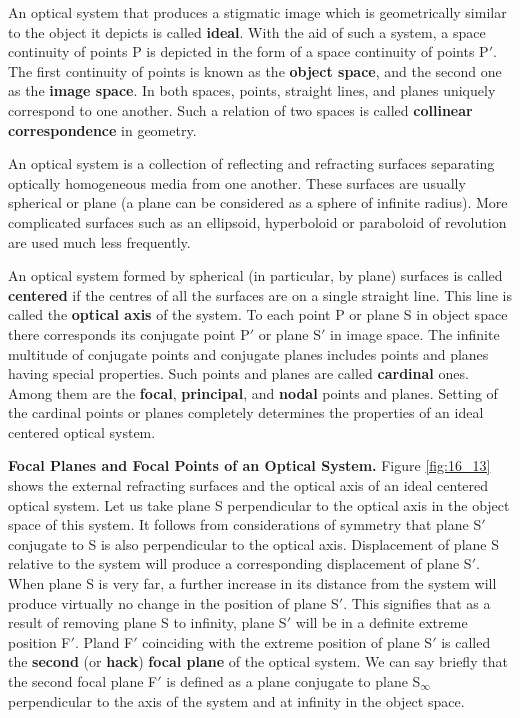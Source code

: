 An optical system that produces a stigmatic image which is geometrically similar to the object it depicts is called \textbf{ideal}.
With the aid of such a system, a space continuity of points P is depicted in the form of a space continuity of points P$'$.
The first continuity of points is known as the \textbf{object space}, and the second one as the \textbf{image space}.
In both spaces, points, straight lines, and planes uniquely correspond to one another.
Such a relation of two spaces is called \textbf{collinear correspondence} in geometry.

An optical system is a collection of reflecting and refracting surfaces separating optically homogeneous media from one another.
These surfaces are usually spherical or plane (a plane can be considered as a sphere of infinite radius).
More complicated surfaces such as an ellipsoid, hyperboloid or paraboloid of revolution are used much
less frequently.

An optical system formed by spherical (in particular, by plane) surfaces is called \textbf{centered} if the centres of all the surfaces are on a single straight line.
This line is called the \textbf{optical axis} of the system.
To each point P or plane S in object space there corresponds its conjugate point P$'$ or plane S$'$ in image space.
The infinite multitude of conjugate points and conjugate planes includes points and planes having special properties.
Such points and planes are called \textbf{cardinal} ones.
Among them are the \textbf{focal}, \textbf{principal}, and \textbf{nodal} points and
planes.
Setting of the cardinal points or planes completely determines the properties of an ideal centered optical system.

\textbf{Focal Planes and Focal Points of an Optical System.}
Figure \ref{fig:16_13} shows the external refracting surfaces and the optical axis of an ideal centered optical system.
Let us take plane S perpendicular to the optical axis in the object space of this system.
It follows from considerations of symmetry that plane S$'$ conjugate to S is also perpendicular to the optical axis.
Displacement of plane S relative to the system will produce a corresponding displacement of plane S$'$.
When plane S is very far, a further increase in its distance from the system will produce virtually no change in the position of plane S$'$.
This signifies that as a result of removing plane S to infinity, plane S$'$ will be in a definite extreme position F$'$. Pland F$'$ coinciding with the extreme position of plane S$'$ is called the \textbf{second} (or \textbf{hack}) \textbf{focal plane} of the optical system.
We can say briefly that the second focal plane F$'$ is defined as a plane conjugate to plane S$_{\infty}$ perpendicular to the axis of the system and at infinity in the object space.

